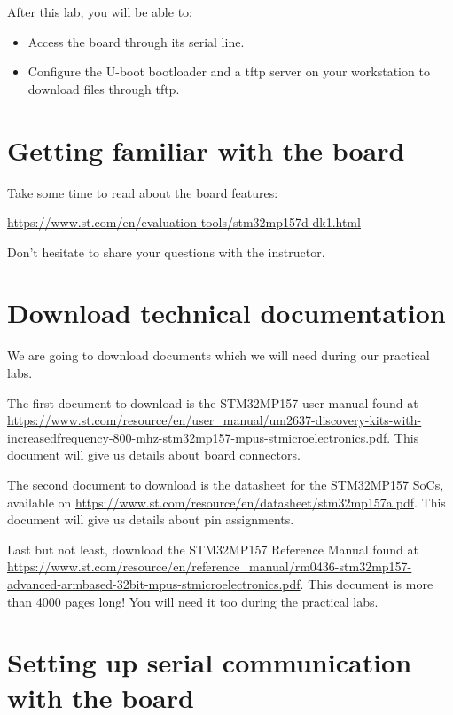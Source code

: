 
After this lab, you will be able to:
\begin{itemize}
\item Access the board through its serial line.
\item Configure the U-boot bootloader and a tftp server
      on your workstation to download files through tftp.
\end{itemize}

\section{Getting familiar with the board}

Take some time to read about the board features:

\url{https://www.st.com/en/evaluation-tools/stm32mp157d-dk1.html}

Don't hesitate to share your questions with the instructor.

\section{Download technical documentation}

We are going to download documents which we will need during our
practical labs.

The first document to download is the STM32MP157 user manual found at
\url{https://www.st.com/resource/en/user_manual/um2637-discovery-kits-with-increasedfrequency-800-mhz-stm32mp157-mpus-stmicroelectronics.pdf}.
This document will give us details about board connectors.

The second document to download is the datasheet for the STM32MP157 SoCs,
available on
\url{https://www.st.com/resource/en/datasheet/stm32mp157a.pdf}.
This document will give us details about pin assignments.

Last but not least, download the STM32MP157 Reference Manual found at
\url{https://www.st.com/resource/en/reference_manual/rm0436-stm32mp157-advanced-armbased-32bit-mpus-stmicroelectronics.pdf}.
This document is more than 4000 pages long!
You will need it too during the practical labs.

\section{Setting up serial communication with the board}

